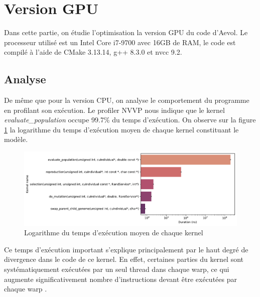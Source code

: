 \documentclass[a4paper, 10pt, twoside]{article}
\begin{document}
\section{Version GPU}

Dans cette partie, on étudie l'optimisation la version GPU du code d'Aevol. Le processeur utilisé est un Intel Core i7-9700 avec 16GB de RAM, le code est compilé à l'aide de CMake 3.13.14, g++ 8.3.0 et nvcc 9.2.

\subsection{Analyse}

De même que pour la version CPU, on analyse le comportement du programme en profilant son exécution. Le profiler NVVP nous indique que le kernel \textit{evaluate\_population} occupe 99.7\% du temps d'exécution. On observe sur la figure \ref{fig:kernel/timings} la logarithme du temps d'exécution moyen de chaque kernel constituant le modèle.

\begin{figure}[htpb]
	\centering
	\includegraphics[width=0.7\linewidth]{img/kernel_timings.pdf}
	\caption{Logarithme du temps d'exécution moyen de chaque kernel}
	\label{fig:kernel/timings}
\end{figure}

Ce temps d'exécution important s'explique principalement par le haut degré de divergence dans le code de ce kernel. En effet, certaines parties du kernel sont systématiquement exécutées par un seul thread dans chaque warp, ce qui augmente significativement nombre d'instructions devant être exécutées par chaque warp \cite{nvidia/branching}.




\end{document}
